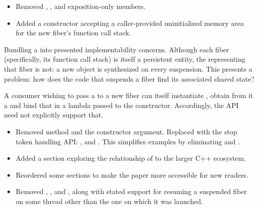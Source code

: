 
\begin{itemize}
    \item Removed \getsource, \gettoken, \reqstop and
          exposition-only  members.
    \item Added a \fiber constructor accepting a caller-provided
          uninitialized memory area for the new fiber's function call stack.
\end{itemize}

Bundling a  into \fiber presented implementability concerns.
Although each fiber (specifically, its function call stack) is itself a
persistent entity, the \fiber representing that fiber is not: a
new \fiber object is synthesized on every suspension. This
presents a problem: how does the code that suspends a fiber find its
associated  shared state?

A consumer wishing to pass a  to a new fiber can itself
instantiate , obtain from it a  and
bind that  in a lambda passed to the \fiber
constructor. Accordingly, the \fiber API need not explicitly support that.


\begin{itemize}
    \item Removed  method and the \cancelfn constructor
          argument. Replaced with the  stop token handling
          API: \getsource, \gettoken and \reqstop. This simplifies examples by
          eliminating  and .
    \item Added a section exploring the relationship of \fiber to the larger
          C++ ecosystem.
    \item Reordered some sections to make the paper more accessible for new readers.
\end{itemize}


\begin{itemize}
    \item Removed \xtresume, \xtresumewith, \xtcancel and \canxtresume, along
          with stated support for resuming a suspended fiber on some thread
          other than the one on which it was launched.
\end{itemize}

